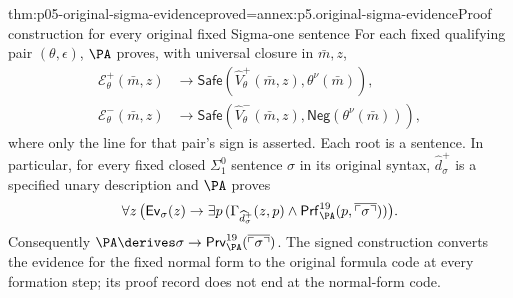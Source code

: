 \begin{hbtheorem}{thm:p05-original-sigma-evidence}{proved=annex:p5.original-sigma-evidence}{Proof construction for every original fixed Sigma-one sentence}
For each fixed qualifying pair \((\theta,\epsilon)\), \(\PA\)
proves, with universal closure in \(\bar m,z\),
\[
\begin{aligned}
 \mathcal E_\theta^+(\bar m,z)&\to
  \mathsf{Safe}(\widehat V_\theta^+(\bar m,z),\theta^\nu(\bar m)),\\
 \mathcal E_\theta^-(\bar m,z)&\to
  \mathsf{Safe}(\widehat V_\theta^-(\bar m,z),
                                      \mathsf{Neg}(\theta^\nu(\bar m))),
\end{aligned}
\]
where only the line for that pair's sign is asserted. Each root is a
sentence. In particular, for every fixed closed \(\Sigma^0_1\) sentence
\(\sigma\) in its original syntax, \(\widehat d_\sigma^+\) is a
specified unary description and \(\PA\) proves
\[
 \forall z\,\bigl(\mathsf{Ev}_\sigma(z)\to
    \exists p\,(\Gamma_{\widehat d_\sigma^+}(z,p)\land
       \mathsf{Prf}^{19}_{\PA}(p,\overline{\ulcorner\sigma\urcorner}))\bigr).
\]
Consequently \(\PA\derives\sigma\to
\mathsf{Prv}^{19}_{\PA}(\overline{\ulcorner\sigma\urcorner})\).
The signed construction converts the evidence for the fixed normal form
to the original formula code at every formation step; its proof record
does not end at the normal-form code.
\end{hbtheorem}

